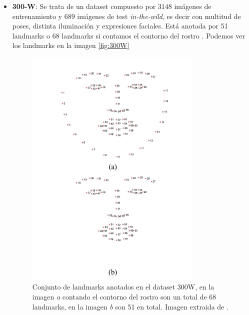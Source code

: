             \begin{itemize}
                \item \textbf{300-W}: Se trata de un dataset compuesto por $3148$ imágenes de entrenamiento y $689$ imágenes de test \textit{in-the-wild}, es decir con multitud de poses, distinta iluminación y expresiones faciales. Está anotada por 51 landmarks o 68 landmarks si contamos el contorno del rostro \cite{300W}. Podemos ver los landmarks en la imagen \autoref{fig:300W}
                
                \begin{figure}[!h]
                    \centering
                    \includegraphics[width=0.8\textwidth]{img/33W.png}
                    \caption{Conjunto de landmarks anotados en el dataset 300W, en la imagen \textit{a} contando el contorno del rostro son un total de 68 landmarks, en la imagen \textit{b} son 51 en total. Imagen extraida de \cite{300W}.}
                    \label{fig:300W}
                \end{figure}
                

\end{itemize}
